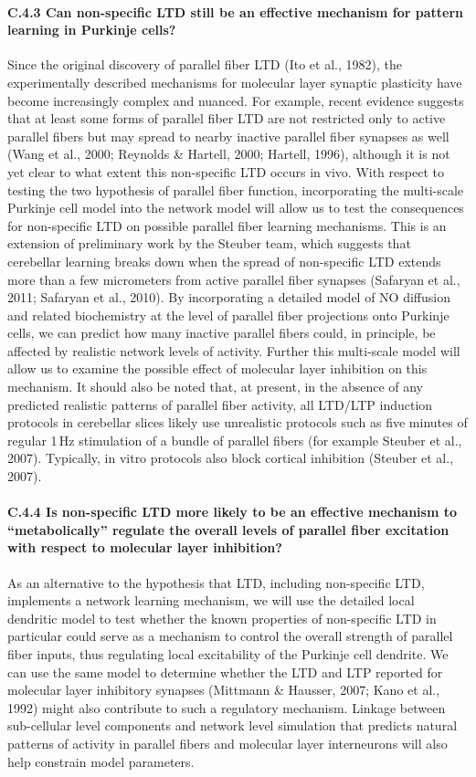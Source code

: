 \documentclass[12pt]{article}
\begin{document}
{\paragraph{C.4.3 Can non-specific LTD still be an effective mechanism for pattern learning in Purkinje cells?} Since the original discovery of parallel fiber LTD (Ito et al., 1982), the experimentally described mechanisms for molecular layer synaptic plasticity have become increasingly complex and nuanced. For example, recent evidence suggests that at least some forms of parallel fiber LTD are not restricted only to active parallel fibers but may spread to nearby inactive parallel fiber synapses as well (Wang et al., 2000; Reynolds \& Hartell, 2000; Hartell, 1996), although it is not yet clear to what extent this non-specific LTD occurs in vivo. With respect to testing the two hypothesis of parallel fiber function, incorporating the multi-scale Purkinje cell model into the network model will allow us to test the consequences for non-specific LTD on possible parallel fiber learning mechanisms. This is an extension of preliminary work by the Steuber team, which suggests that cerebellar learning breaks down when the spread of non-specific LTD extends more than a few micrometers from active parallel fiber synapses (Safaryan et al., 2011; Safaryan et al., 2010). By incorporating a detailed model of NO diffusion and related biochemistry at the level of parallel fiber projections onto Purkinje cells, we can predict how many inactive parallel fibers could, in principle, be affected by realistic network levels of activity. Further this multi-scale model will allow us to examine the possible effect of molecular layer inhibition on this mechanism. It should also be noted that, at present, in the absence of any predicted realistic patterns of parallel fiber activity, all LTD/LTP induction protocols in cerebellar slices likely use unrealistic protocols such as five minutes of regular 1\,Hz stimulation of a bundle of parallel fibers  (for example Steuber et al., 2007). Typically, in vitro protocols also block cortical inhibition (Steuber et al., 2007).

\paragraph{C.4.4 Is non-specific LTD more likely to be an effective mechanism to ``metabolically'' regulate the overall levels of parallel fiber excitation with respect to molecular layer inhibition?} As an alternative to the hypothesis that LTD, including non-specific LTD, implements a network learning mechanism, we will use the detailed local dendritic model to test whether the known properties of non-specific LTD in particular could serve as a mechanism to control the overall strength of parallel fiber inputs, thus regulating local excitability of the Purkinje cell dendrite. We can use the same model to determine whether the LTD and LTP reported for molecular layer inhibitory synapses (Mittmann \& Hausser, 2007; Kano et al., 1992) might also contribute to such a regulatory mechanism. Linkage between sub-cellular level components and network level simulation that predicts natural patterns of activity in parallel fibers and molecular layer interneurons will also help constrain model parameters.

}
\end{document}
